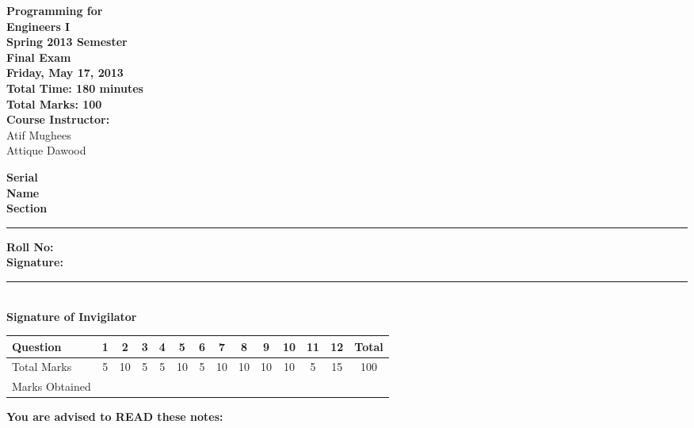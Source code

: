 \documentclass[12pt,a4paper]{article}
\def\QOne{5}
\def\Qtwo{10}
\def\Qthree{5}
\def\Qfour{5}
\def\Qfive{10}
\def\Qsix{5}
\def\Qseven{10}
\def\Qeight{10}
\def\Qnine{10}
\def\Qten{10}
\def\Qeleven{5}
\def\Qtwelve{15}
\def\TotalMarks{100}
\begin{document}
\begin{minipage}{0.55\textwidth}
{\LARGE \textbf{Programming for\\ Engineers I}}\\[0.15cm]
{\normalsize \textbf{Spring 2013 Semester}}\\
{\Large \textbf{Final Exam}}\\
{\normalsize \textbf{Friday, May 17, 2013}}\\[0.30cm]
{\Large \textbf{Total Time: 180 minutes}}\\[0.15cm]
{\Large \textbf{Total Marks: 100}}\\
\textbf{Course Instructor:}\\
Atif Mughees\\
Attique Dawood\\
\end{minipage}
\begin{minipage}{0.4\textwidth}
\textbf{Serial} \hrulefill \\[0.25cm]
\textbf{Name} \hrulefill\\[0.25cm]
\textbf{Section} \rule{1cm}{0.2mm} \textbf{Roll No:} \hrulefill\\[0.25cm]
\textbf{Signature:} \hrulefill\\[0.25cm]
\rule{6.6cm}{0.2mm}\\
\textbf{Signature of Invigilator}\\[0.25cm]
\end{minipage}
\begin{table}[H]
\begin{center}
\vspace{0.3cm}
	{\large \begin{tabular}{|l|c|c|c|c|c|c|c|c|c|c|c|c|c|}
	\hline
		\rule{0pt}{2.6ex} Question & \textbf{1} & \textbf{2} & \textbf{3} & \textbf{4} & \textbf{5} & \textbf{6} & \textbf{7} & \textbf{8} & \textbf{9} & \textbf{10} & \textbf{11} & \textbf{12} & \textbf{Total}\\
		\hline
		Total Marks \rule{0pt}{2.6ex} & \QOne & \Qtwo & \Qthree & \Qfour & \Qfive & \Qsix & \Qseven & \Qeight & \Qnine & \Qten & \Qeleven & \Qtwelve & \TotalMarks\\
		\hline
		Marks Obtained \rule{0pt}{2.6ex} & & & & & & & & & & & & &\\
	\hline
	\end{tabular}}
\end{center}
\end{table}
\noindent \textbf{You are advised to READ these notes:}
\end{document}
